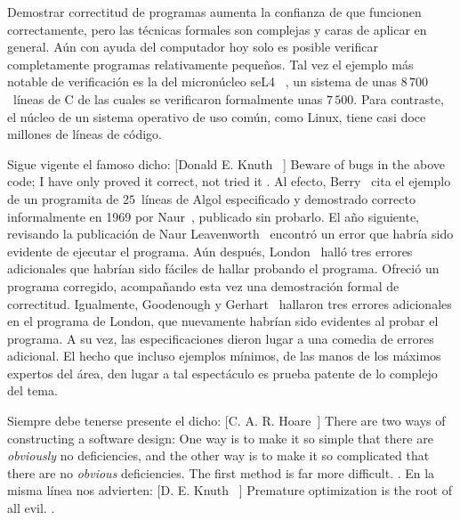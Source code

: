   Demostrar correctitud de programas aumenta la confianza
  de que funcionen correctamente,
  pero las técnicas formales son complejas y caras
  de aplicar en general.
  Aún con ayuda del computador
  hoy solo es posible verificar completamente
  programas relativamente pequeños.
  Tal vez el ejemplo más notable de verificación
  es la del micronúcleo seL4~%
    \cite{Klein:2010:SFV:1743546.1743574, klein11:_l4},%
  un sistema de unas \(8\,700\)~líneas de C
  de las cuales se verificaron formalmente unas \(7\,500\).
  Para contraste,
  el núcleo de un sistema operativo de uso común,
  como Linux,
  tiene casi doce millones de líneas de código.

  Sigue vigente el famoso dicho:
      [Donald E. Knuth~%
	 \cite{knuth77:_notes_emde_boas_const_prior_deques}]{%
    Beware of bugs in the above code;
    I have only proved it correct,
    not tried it%
  }.%
  Al efecto,
  Berry~\cite{berry92:_academ_legit_softw_eng_discipl}
  cita el ejemplo de un programita de \(25\)~líneas de Algol%
  especificado
  y demostrado correcto informalmente en 1969
  por Naur~\cite{naur69:_progr_action_clust},%
  publicado sin probarlo.
  El año siguiente,
  revisando la publicación de Naur Leavenworth~%
    \cite{leavenworth70:_19420}
  encontró un error que habría sido evidente
  de ejecutar el programa.
  Aún después,
  London~\cite{london71:_softw_reliab_proving_prog_correct}
  halló tres errores adicionales que habrían sido fáciles de hallar
  probando el programa.
  Ofreció un programa corregido,
  acompañando esta vez una demostración formal de correctitud.
  Igualmente,
  Goodenough y Gerhart~%
    \cite{goodenough75:_towar_theor_test_data_selec}
  hallaron tres errores adicionales en el programa de London,
  que nuevamente habrían sido evidentes al probar el programa.
  A su vez,
  las especificaciones dieron lugar
  a una comedia de errores adicional.
  El hecho que incluso ejemplos mínimos,
  de las manos de los máximos expertos del área,
  den lugar a tal espectáculo
  es prueba patente de lo complejo del tema.

  Siempre debe tenerse presente el dicho:
      [C. A. R. Hoare~\cite{hoare81:_old_clothes}]{%
    There are two ways of constructing a software design:
    One way is to make it so simple
    that there are \emph{obviously} no deficiencies,
    and the other way is to make it so complicated
    that there are no \emph{obvious} deficiencies.
    The first method is far more difficult.%
  }.%
  En la misma línea nos advierten:
      [D. E. Knuth~%
	 \cite{knuth74:_struc_progr_goto, knuth89:_errors_TeX}]{%
    Premature optimization is the root of all evil.%
  }.%

